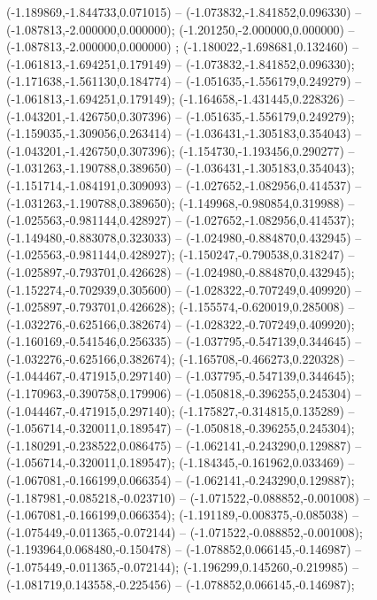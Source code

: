  (-1.189869,-1.844733,0.071015) -- (-1.073832,-1.841852,0.096330) -- (-1.087813,-2.000000,0.000000);
 (-1.201250,-2.000000,0.000000) -- (-1.087813,-2.000000,0.000000) ;
 (-1.180022,-1.698681,0.132460) -- (-1.061813,-1.694251,0.179149) -- (-1.073832,-1.841852,0.096330);
 (-1.171638,-1.561130,0.184774) -- (-1.051635,-1.556179,0.249279) -- (-1.061813,-1.694251,0.179149);
 (-1.164658,-1.431445,0.228326) -- (-1.043201,-1.426750,0.307396) -- (-1.051635,-1.556179,0.249279);
 (-1.159035,-1.309056,0.263414) -- (-1.036431,-1.305183,0.354043) -- (-1.043201,-1.426750,0.307396);
 (-1.154730,-1.193456,0.290277) -- (-1.031263,-1.190788,0.389650) -- (-1.036431,-1.305183,0.354043);
 (-1.151714,-1.084191,0.309093) -- (-1.027652,-1.082956,0.414537) -- (-1.031263,-1.190788,0.389650);
 (-1.149968,-0.980854,0.319988) -- (-1.025563,-0.981144,0.428927) -- (-1.027652,-1.082956,0.414537);
 (-1.149480,-0.883078,0.323033) -- (-1.024980,-0.884870,0.432945) -- (-1.025563,-0.981144,0.428927);
 (-1.150247,-0.790538,0.318247) -- (-1.025897,-0.793701,0.426628) -- (-1.024980,-0.884870,0.432945);
 (-1.152274,-0.702939,0.305600) -- (-1.028322,-0.707249,0.409920) -- (-1.025897,-0.793701,0.426628);
 (-1.155574,-0.620019,0.285008) -- (-1.032276,-0.625166,0.382674) -- (-1.028322,-0.707249,0.409920);
 (-1.160169,-0.541546,0.256335) -- (-1.037795,-0.547139,0.344645) -- (-1.032276,-0.625166,0.382674);
 (-1.165708,-0.466273,0.220328) -- (-1.044467,-0.471915,0.297140) -- (-1.037795,-0.547139,0.344645);
 (-1.170963,-0.390758,0.179906) -- (-1.050818,-0.396255,0.245304) -- (-1.044467,-0.471915,0.297140);
 (-1.175827,-0.314815,0.135289) -- (-1.056714,-0.320011,0.189547) -- (-1.050818,-0.396255,0.245304);
 (-1.180291,-0.238522,0.086475) -- (-1.062141,-0.243290,0.129887) -- (-1.056714,-0.320011,0.189547);
 (-1.184345,-0.161962,0.033469) -- (-1.067081,-0.166199,0.066354) -- (-1.062141,-0.243290,0.129887);
 (-1.187981,-0.085218,-0.023710) -- (-1.071522,-0.088852,-0.001008) -- (-1.067081,-0.166199,0.066354);
 (-1.191189,-0.008375,-0.085038) -- (-1.075449,-0.011365,-0.072144) -- (-1.071522,-0.088852,-0.001008);
 (-1.193964,0.068480,-0.150478) -- (-1.078852,0.066145,-0.146987) -- (-1.075449,-0.011365,-0.072144);
 (-1.196299,0.145260,-0.219985) -- (-1.081719,0.143558,-0.225456) -- (-1.078852,0.066145,-0.146987);
